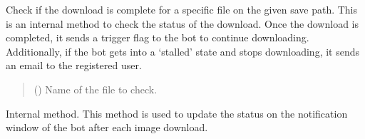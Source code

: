 \documentclass[letterpaper,10pt,english]{sphinxmanual}
\begin{document}

\begin{fulllineitems}
\label{\detokenize{index:gebot.ImageDownloader.__check_download_complete__}}
\pysigstartsignatures
{}
\pysigstopsignatures
\sphinxAtStartPar
Check if the download is complete for a specific file on the given save path. This is an internal method to check the status of the download.
Once the download is completed, it sends a trigger flag to the bot to continue downloading. Additionally, if the bot gets into a ‘stalled’ state and stops downloading, it sends an email to the registered user.
\begin{quote}\begin{description}
\sphinxAtStartPar
{} () \textendash{} Name of the file to check.

\end{description}\end{quote}

\end{fulllineitems}


\begin{fulllineitems}
\label{\detokenize{index:gebot.ImageDownloader.__update_status__}}
\pysigstartsignatures
{}
\pysigstopsignatures
\sphinxAtStartPar
Internal method. This method is used to update the status on the notification window of the bot after each image download.

\end{fulllineitems}

\end{document}
